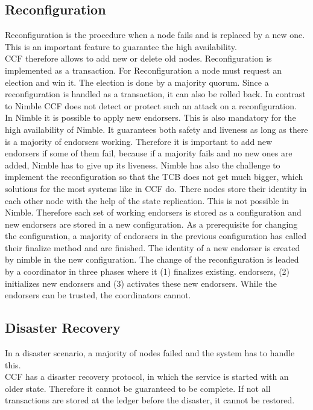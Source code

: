\subsection{Reconfiguration}
\label{reconNimble}
Reconfiguration is the procedure when a node fails and is replaced by a new one. This is an important feature to guarantee the high availability.\\
CCF therefore allows to add new or delete old nodes. Reconfiguration is implemented as a transaction. For Reconfiguration a node must request an election and win it. The election is done by a majority quorum. Since a reconfiguration is handled as a transaction, it can also be rolled back. In contrast to Nimble CCF does not detect or protect such an attack on a reconfiguration.\\%
In Nimble it is possible to apply new endorsers. This is also mandatory for the high availability of Nimble. It guarantees both safety and liveness as long as there is a majority of endorsers working. Therefore it is important to add new endorsers if some of them fail, because if a majority fails and no new ones are added, Nimble has to give up its liveness. Nimble has also the challenge to implement the reconfiguration so that the TCB does not get much bigger, which solutions for the most systems like in CCF do. There nodes store their identity in each other node with the help of the state replication. This is not possible in Nimble. Therefore each set of working endorsers is stored as a configuration and new endorsers are stored in a new configuration. As a prerequisite for changing the configuration, a majority of endorsers in the previous configuration has called their finalize method and are finished. The identity of a new endorser is created by nimble in the new configuration. The change of the reconfiguration is leaded by a coordinator in three phases where it (1) finalizes existing. endorsers, (2) initializes new endorsers and (3) activates these new endorsers. While the endorsers can be trusted, the coordinators cannot. 

\subsection{Disaster Recovery}
In a disaster scenario, a majority of nodes failed and the system has to handle this.\\
CCF has a disaster recovery protocol, in which the service is started with an older state. Therefore it cannot be guaranteed to be complete. If not all transactions are stored at the ledger before the disaster, it cannot be restored. 


